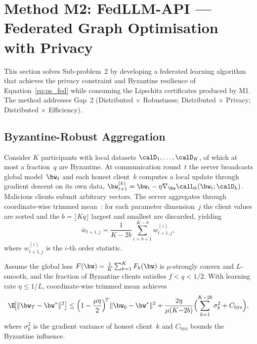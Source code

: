 \section{Method M2: FedLLM-API --- Federated Graph Optimisation with Privacy}
\label{sec:fedllm}

This section solves Sub-problem~2 by developing a federated learning algorithm that achieves the privacy constraint and Byzantine resilience of Equation~\eqref{eq:ps_fed} while consuming the Lipschitz certificates produced by M1. The method addresses Gap~2 (Distributed $\times$ Robustness; Distributed $\times$ Privacy; Distributed $\times$ Efficiency).

\subsection{Byzantine-Robust Aggregation}

Consider $K$ participants with local datasets $\calD_1,\dots,\calD_K$, of which at most a fraction~$q$ are Byzantine. At communication round~$t$ the server broadcasts global model~$\bw_t$ and each honest client~$k$ computes a local update through gradient descent on its own data, $\bw_{t+1}^{(k)}=\bw_t - \eta\nabla_{\bw}\calL_k(\bw_t;\calD_k)$. Malicious clients submit arbitrary vectors. The server aggregates through coordinate-wise trimmed mean~\cite{Yin2018,Blanchard2017,Li2020fedprox}: for each parameter dimension~$j$ the client values are sorted and the $b=\lfloor Kq\rfloor$ largest and smallest are discarded, yielding
\begin{equation}
\bar{w}_{t+1,j}
= \frac{1}{K-2b}\sum_{i=b+1}^{K-b}w_{t+1,j}^{(i)},
\label{eq:fed_trim}
\end{equation}
where $w_{t+1,j}^{(i)}$ is the $i$-th order statistic.

\begin{theorem}
\label{thm:fed_conv}
Assume the global loss $F(\bw)=\frac{1}{K}\sum_{k=1}^K F_k(\bw)$ is $\mu$-strongly convex and $L$-smooth, and the fraction of Byzantine clients satisfies $f<q<1/2$. With learning rate $\eta\le 1/L$, coordinate-wise trimmed mean achieves
\begin{equation}
\E\!\bigl[\|\bw_T-\bw^*\|^2\bigr]
\le \Bigl(1-\frac{\mu\eta}{2}\Bigr)^{\!T}\|\bw_0-\bw^*\|^2
  + \frac{2\eta}{\mu(K{-}2b)}
    \Bigl(\sum_{k=1}^{K-2b}\sigma_k^2 + C_{\mathrm{byz}}\Bigr),
\label{eq:fed_conv_bound}
\end{equation}
where $\sigma_k^2$ is the gradient variance of honest client~$k$ and $C_{\mathrm{byz}}$ bounds the Byzantine influence.
\end{theorem}

